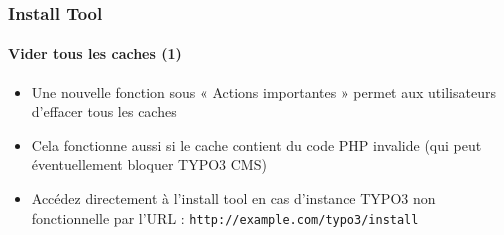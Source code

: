 
\begin{frame}[fragile]
	\frametitle{Install Tool}
	\framesubtitle{Vider tous les caches (1)}

	\begin{itemize}
		\item Une nouvelle fonction sous « Actions importantes » permet aux utilisateurs d'effacer tous les caches
		\item Cela fonctionne aussi si le cache contient du code PHP invalide\newline
			(qui peut éventuellement bloquer TYPO3 CMS)
		\item Accédez directement à l'install tool en cas d'instance TYPO3 non fonctionnelle par l'URL : \texttt{http://example.com/typo3/install}
	\end{itemize}


\end{frame}
